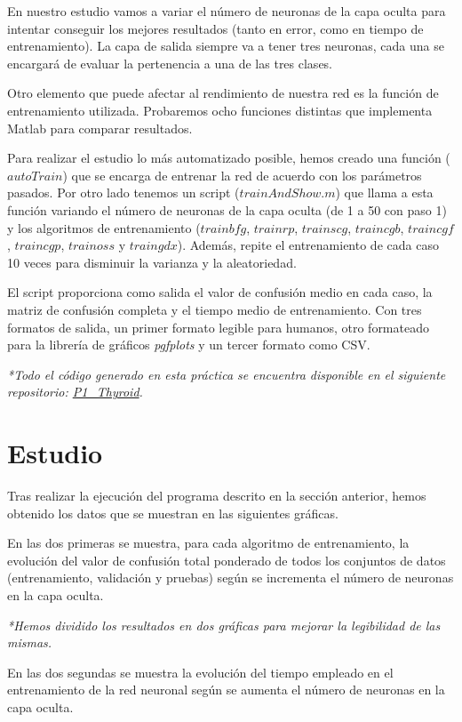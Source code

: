 \documentclass[a4paper,12pt,titlepage]{article}
\begin{document}
En nuestro estudio vamos a variar el número de neuronas de la capa oculta para intentar conseguir los mejores resultados (tanto en error, como en tiempo de entrenamiento). La capa de salida siempre va a tener tres neuronas, cada una se encargará de evaluar la pertenencia a una de las tres clases.

Otro elemento que puede afectar al rendimiento de nuestra red es la función de entrenamiento utilizada. Probaremos ocho funciones distintas que implementa Matlab para comparar resultados.

Para realizar el estudio lo más automatizado posible, hemos creado una función ($autoTrain$) que se encarga de entrenar la red de acuerdo con los parámetros pasados. Por otro lado tenemos un script ($trainAndShow.m$) que llama a esta función variando el número de neuronas de la capa oculta (de 1 a 50 con paso 1) y los algoritmos de entrenamiento ($trainbfg$, $trainrp$, $trainscg$, $traincgb$,  $traincgf$, $traincgp$, $trainoss$ y $traingdx$). Además, repite el entrenamiento de cada caso 10 veces para disminuir la varianza y la aleatoriedad.

El script proporciona como salida el valor de confusión medio en cada caso,  la matriz de confusión completa y el tiempo medio de entrenamiento. Con tres formatos de salida, un primer formato legible para humanos, otro formateado para la librería de gráficos \textit{pgfplots} y un tercer formato como CSV.

\emph{*Todo el código generado en esta práctica se encuentra disponible en el siguiente repositorio: 
\href{https://github.com/davidmigloz/neuronal-networks/tree/master/P1\_Thyroid}{P1\_Thyroid}.}

\section{Estudio}

Tras realizar la ejecución del programa descrito en la sección anterior, hemos obtenido los datos que se muestran en las siguientes gráficas.

En las dos primeras se muestra, para cada algoritmo de entrenamiento, la evolución del valor de confusión total ponderado de todos los conjuntos de datos (entrenamiento, validación y pruebas) según se incrementa el número de neuronas en la capa oculta. 

\textit{*Hemos dividido los resultados en dos gráficas para mejorar la legibilidad de las mismas.}

En las dos segundas se muestra la evolución del tiempo empleado en el entrenamiento de la red neuronal según se aumenta el número de neuronas en la capa oculta.
\end{document}
